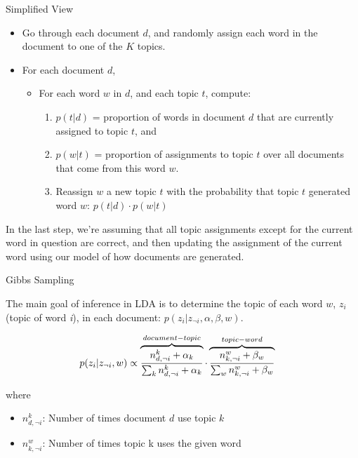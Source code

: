 \documentclass[
  ignorenonframetext,
]{beamer}
\begin{document}
\begin{frame}{Simplified View}
\protect\hypertarget{simplified-view}{}

\footnotesize
\begin{itemize}
\item Go through each document $d$, and randomly assign each word in the document to one of the $K$ topics.
\item For each document $d$, 
   \begin{itemize}
      \item For each word $w$ in $d$, and each topic $t$, compute: 
      \begin{enumerate}
        \item $p( t |  d)$ =  proportion of words in document $d$ that are currently assigned to topic $t$, and        
        \item $p( w |  t)$ =  proportion of assignments to topic $t$ over all documents that come from this word $w$.
        \item Reassign $w$ a new topic $t$ with the probability that topic $t$ generated word $w$: $p( t |  d) \cdot p( w |  t)$
      \end{enumerate}
    \end{itemize}   
\end{itemize}

In the last step, we're assuming that all topic assignments except for
the current word in question are correct, and then updating the
assignment of the current word using our model of how documents are
generated.

\end{frame}

\begin{frame}{Gibbs Sampling}
\protect\hypertarget{gibbs-sampling-2}{}

The main goal of inference in LDA is to determine the topic of each word
\(w\), \(z_{i}\) (topic of word \emph{i}), in each document:
\(p(z_{i}|z_{\neg i}, \alpha, \beta, w)\).

\begin{equation}
\begin{aligned}
p(z_{i}|z_{\neg i}, w) & \propto \overbrace{ {n_{d,\neg i}^{k} + \alpha_{k} \over 
  \sum_{k} n_{d,\neg i}^{k} + \alpha_{k}} }^{document-topic} \cdot \overbrace{ {n_{k,\neg i}^{w} + \beta_{w} \over 
  \sum_{w} n_{k,\neg i}^{w} + \beta_{w}}}^{topic-word} 
\end{aligned}
\end{equation}

where

\begin{itemize}
\item
  \(n_{d,\neg i}^{k}\): Number of times document \(d\) use topic \(k\)
\item
  \(n_{k,\neg i}^{w}\): Number of times topic k uses the given word
\end{itemize}

\end{frame}
\end{document}
